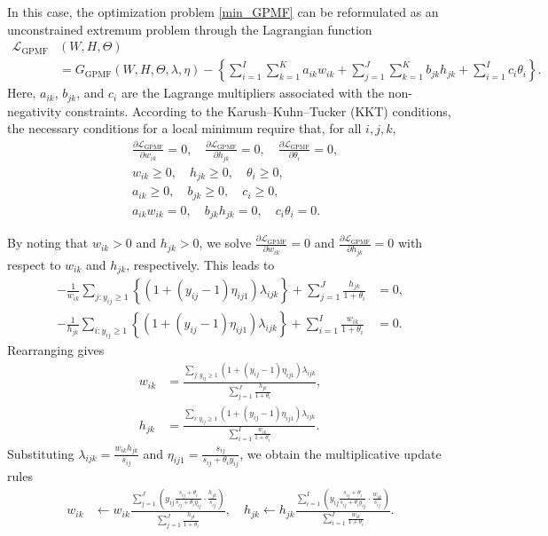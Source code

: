 \documentclass[pdflatex,sn-basic]{sn-jnl}%
\theoremstyle{thmstyleone}%
\theoremstyle{thmstyletwo}%
\theoremstyle{thmstylethree}%
\begin{document}
In this case, the optimization problem \eqref{min_GPMF} can be reformulated as an unconstrained extremum problem through the Lagrangian function
\begin{align*}
	\mathcal{L}_{\mathrm{GPMF}}&(W,H,\Theta) \\
	&= G_{\mathrm{GPMF}}(W,H,\Theta,\lambda,\eta)
	- \left\{ 
		\sum_{i=1}^{I}\sum_{k=1}^{K}a_{ik}w_{ik} 
		+ \sum_{j=1}^{J}\sum_{k=1}^{K}b_{jk}h_{jk} 
		+ \sum_{i=1}^{I}c_{i}\theta_{i} 
	\right\}.
\end{align*}
Here, $a_{ik}$, $b_{jk}$, and $c_{i}$ are the Lagrange multipliers associated with the non-negativity constraints.  
According to the Karush--Kuhn--Tucker (KKT) conditions, the necessary conditions for a local minimum require that, for all $i,j,k$,
\begin{align*}
	&\frac{\partial \mathcal{L}_{\mathrm{GPMF}}}{\partial w_{ik}} = 0,\quad 
	\frac{\partial \mathcal{L}_{\mathrm{GPMF}}}{\partial h_{jk}} = 0,\quad 
	\frac{\partial \mathcal{L}_{\mathrm{GPMF}}}{\partial \theta_{i}} = 0,\\
	&w_{ik}\ge0,\quad h_{jk}\ge0,\quad \theta_{i}\ge0,\\
	&a_{ik}\ge0,\quad b_{jk}\ge 0,\quad c_{i}\ge 0,\\
	&a_{ik}w_{ik}=0,\quad b_{jk}h_{jk}=0,\quad c_{i}\theta_{i}=0.
\end{align*}

By noting that $w_{ik}>0$ and $h_{jk}>0$, we solve 
$\tfrac{\partial \mathcal{L}_{\mathrm{GPMF}}}{\partial w_{ik}}=0$ 
and $\tfrac{\partial \mathcal{L}_{\mathrm{GPMF}}}{\partial h_{jk}}=0$ 
with respect to $w_{ik}$ and $h_{jk}$, respectively. 
This leads to
\begin{align*}
	-\frac{1}{w_{ik}}\sum_{j:y_{ij}\ge 1}\!\left\{(1+(y_{ij}-1)\eta_{ij1})\lambda_{ijk}\right\}
	+ \sum_{j=1}^{J}\frac{h_{jk}}{1+\theta_{i}} &= 0,\\
	-\frac{1}{h_{jk}}\sum_{i:y_{ij}\ge 1}\!\left\{(1+(y_{ij}-1)\eta_{ij1})\lambda_{ijk}\right\}
	+ \sum_{i=1}^{I}\frac{w_{ik}}{1+\theta_{i}} &= 0.
\end{align*}
Rearranging gives
\begin{align*}
	w_{ik} &= \frac{\sum_{j:y_{ij}\ge 1}(1+(y_{ij}-1)\eta_{ij1})\lambda_{ijk}}{\sum_{j=1}^{J}\tfrac{h_{jk}}{1+\theta_{i}}},\\[6pt]
	h_{jk} &= \frac{\sum_{i:y_{ij}\ge 1}(1+(y_{ij}-1)\eta_{ij1})\lambda_{ijk}}{\sum_{i=1}^{I}\tfrac{w_{ik}}{1+\theta_{i}}}.
\end{align*}
Substituting 
$\lambda_{ijk}=\tfrac{w_{ik}h_{jk}}{s_{ij}}$ and 
$\eta_{ij1}=\tfrac{s_{ij}}{s_{ij}+\theta_{i}y_{ij}}$, 
we obtain the multiplicative update rules
\begin{align}
	w_{ik} &\leftarrow 
	w_{ik}\frac{\sum_{j=1}^{J}\!\left(y_{ij}\tfrac{s_{ij}+\theta_{i}}{s_{ij}+\theta_{i}y_{ij}}\cdot\tfrac{h_{jk}}{s_{ij}}\right)}{\sum_{j=1}^{J}\tfrac{h_{jk}}{1+\theta_{i}}},
	\quad
	h_{jk} \leftarrow 
	h_{jk}\frac{\sum_{i=1}^{I}\!\left(y_{ij}\tfrac{s_{ij}+\theta_{i}}{s_{ij}+\theta_{i}y_{ij}}\cdot\tfrac{w_{ik}}{s_{ij}}\right)}{\sum_{i=1}^{I}\tfrac{w_{ik}}{1+\theta_{i}}}.
	\label{update_GPMF}
\end{align}
\end{document}
